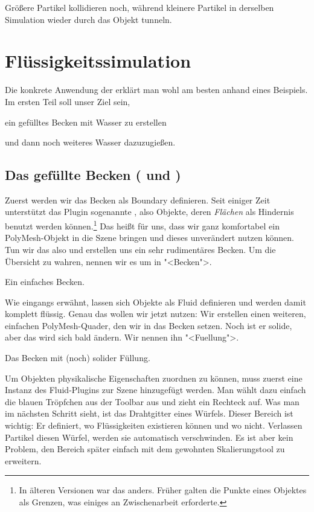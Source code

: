 \documentclass[10pt,DIV=14,a4paper]{scrartcl}
\begin{document}
{Größere Partikel kollidieren noch, während kleinere Partikel in
derselben Simulation wieder durch das Objekt tunneln.}



\pagebreak
\section{Flüssigkeitssimulation}

Die konkrete Anwendung der \fluidsim erklärt man wohl am besten anhand
eines Beispiels. Im ersten Teil soll unser Ziel sein,
\itA
	\item ein gefülltes Becken mit Wasser zu erstellen
	\item und dann noch weiteres Wasser dazuzugießen.
\itE

\subsection{Das gefüllte Becken ( und )}
Zuerst werden wir das Becken als Boundary definieren. Seit einiger Zeit
unterstützt das Plugin sogenannte , also Objekte,
deren \emph{Flächen} als Hindernis benutzt werden können.\footnote{In
älteren Versionen war das anders. Früher galten die Punkte eines
Objektes als Grenzen, was einiges an Zwischenarbeit erforderte.} Das
heißt für uns, dass wir ganz komfortabel ein PolyMesh-Objekt in die
Szene bringen und dieses unverändert nutzen können. Tun wir das also und
erstellen uns ein sehr rudimentäres Becken. Um die Übersicht zu wahren,
nennen wir es um in "<Becken">.

{Ein einfaches Becken.}

Wie eingangs erwähnt, lassen sich Objekte als Fluid definieren und
werden damit komplett flüssig. Genau das wollen wir jetzt nutzen: Wir
erstellen einen weiteren, einfachen PolyMesh-Quader, den wir in das
Becken setzen. Noch ist er solide, aber das wird sich bald ändern. Wir
nennen ihn "<Fuellung">.

{Das Becken mit (noch) solider Füllung.}

Um Objekten physikalische Eigenschaften zuordnen zu können, muss zuerst
eine Instanz des Fluid-Plugins zur Szene hinzugefügt werden. Man wählt
dazu einfach die blauen Tröpfchen aus der Toolbar aus und zieht ein
Rechteck auf. Was man im nächsten Schritt sieht, ist das Drahtgitter
eines Würfels. Dieser Bereich ist wichtig: Er definiert, wo
Flüssigkeiten existieren können und wo nicht. Verlassen Partikel diesen
Würfel, werden sie automatisch verschwinden. Es ist aber kein Problem,
den Bereich später einfach mit dem gewohnten Skalierungstool zu
erweitern.
\end{document}
